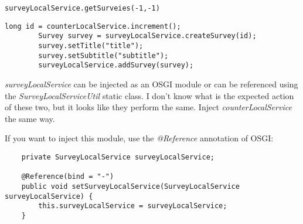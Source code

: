 \lstset{language=java}
\begin{minipage}{\linewidth}
\begin{lstlisting}[caption=Find]
surveyLocalService.getSurveies(-1,-1)
\end{lstlisting}
\end{minipage}

\lstset{language=java}
\begin{minipage}{\linewidth}
\begin{lstlisting}[caption=Insert]
        long id = counterLocalService.increment();
        Survey survey = surveyLocalService.createSurvey(id);
        survey.setTitle("title");
        survey.setSubtitle("subtitle");
        surveyLocalService.addSurvey(survey);
\end{lstlisting}
\end{minipage}

\textit{surveyLocalService} can be injected as an OSGI module or can be referenced using the \textit{SurveyLocalServiceUtil} static class. I don't know what is the expected action of these two, but it looks like they perform the same.
Inject \textit{counterLocalService} the same way.

If you want to inject this module, use the \textit{@Reference} annotation of OSGI:

\lstset{language=java}
\begin{minipage}{\linewidth}
\begin{lstlisting}
    private SurveyLocalService surveyLocalService;

    @Reference(bind = "-")
    public void setSurveyLocalService(SurveyLocalService surveyLocalService) {
        this.surveyLocalService = surveyLocalService;
    }
\end{lstlisting}
\end{minipage}